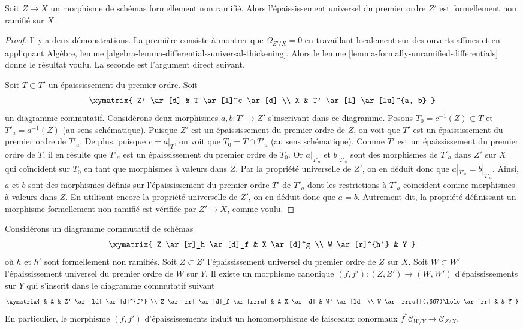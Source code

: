\begin{lemma}
\label{lemma-universal-thickening-unramified}
Soit $Z \to X$ un morphisme de schémas formellement non ramifié.
Alors l'épaississement universel du premier ordre $Z'$ est formellement
non ramifié sur $X$.
\end{lemma}

\begin{proof}
Il y a deux démonstrations. La première consiste à montrer que $\Omega_{Z'/X} = 0$
en travaillant localement sur des ouverts affines et en appliquant
Algèbre, lemme \ref{algebra-lemma-differentials-universal-thickening}.
Alors
le lemme \ref{lemma-formally-unramified-differentials}
donne le résultat voulu.
La seconde est l'argument direct suivant.

\medskip\noindent
Soit $T \subset T'$ un épaississement du premier ordre. Soit
$$
\xymatrix{
Z' \ar[d] & T \ar[l]^c \ar[d] \\
X & T' \ar[l] \ar[lu]^{a, b}
}
$$
un diagramme commutatif. Considérons deux morphismes $a, b : T' \to Z'$
s'inscrivant dans ce diagramme. Posons $T_0 = c^{-1}(Z) \subset T$ et
$T'_a = a^{-1}(Z)$ (au sens schématique).
Puisque $Z'$ est un épaississement du premier ordre de $Z$, on voit que $T'$
est un épaississement du premier ordre de $T'_a$. De plus, puisque $c = a|_T$, on voit que
$T_0 = T \cap T'_a$ (au sens schématique). Comme $T'$ est un épaississement du premier
ordre de $T$, il en résulte que $T'_a$
est un épaississement du premier ordre de $T_0$. Or $a|_{T'_a}$ et $b|_{T'_a}$
sont des morphismes de $T'_a$ dans $Z'$ sur $X$ qui coïncident sur $T_0$ en tant que
morphismes à valeurs dans $Z$. Par la propriété universelle de $Z'$, on en déduit donc que
$a|_{T'_a} = b|_{T'_a}$. Ainsi, $a$ et $b$ sont des morphismes définis sur
l'épaississement du premier ordre $T'$ de $T'_a$ dont les restrictions à
$T'_a$ coïncident comme morphismes à valeurs dans $Z$. En utilisant encore la propriété universelle de
$Z'$, on en déduit donc que $a = b$. Autrement dit, la propriété définissant
un morphisme formellement non ramifié est vérifiée par $Z' \to X$, comme voulu.
\end{proof}

\begin{lemma}
\label{lemma-universal-thickening-functorial}
Considérons un diagramme commutatif de schémas
$$
\xymatrix{
Z \ar[r]_h \ar[d]_f & X \ar[d]^g \\
W \ar[r]^{h'} & Y
}
$$
où $h$ et $h'$ sont formellement non ramifiés. Soit $Z \subset Z'$ l'épaississement universel
du premier ordre de $Z$ sur $X$. Soit $W \subset W'$ l'épaississement universel
du premier ordre de $W$ sur $Y$. Il existe un morphisme canonique
$(f, f') : (Z, Z') \to (W, W')$ d'épaississements sur $Y$ qui s'inscrit dans
le diagramme commutatif suivant
$$
\xymatrix{
& & & Z' \ar[ld] \ar[d]^{f'} \\
Z \ar[rr] \ar[d]_f \ar[rrru] & & X \ar[d] & W' \ar[ld] \\
W \ar[rrru]|(.667)\hole \ar[rr] & & Y
}
$$
En particulier, le morphisme $(f, f')$ d'épaississements induit un homomorphisme
de faisceaux conormaux $f^*\mathcal{C}_{W/Y} \to \mathcal{C}_{Z/X}$.
\end{lemma}

